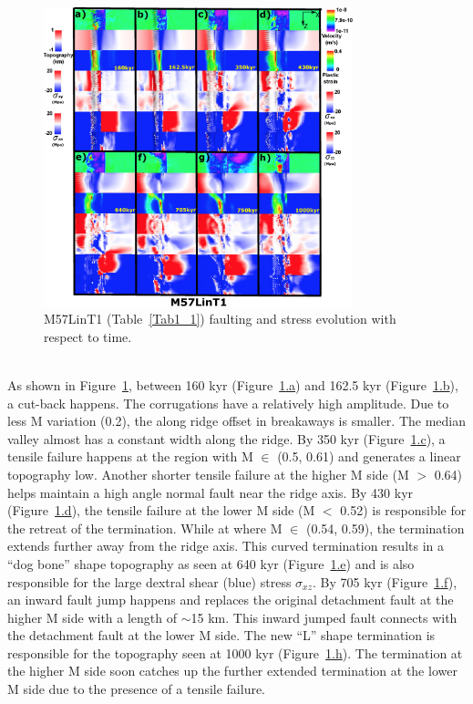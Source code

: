 \begin{figure}[h]
 \centering
  \includegraphics[width=0.8\textwidth]{./Figures/fig_Results_MRange_2_M57LinT1_time_evolution.eps}
 \caption{M57LinT1 (Table~\hyperref[Tab1_1]{\ref{Tab1_1}}) faulting and stress evolution with respect to time.}
\label{fig_Results_MRange_2}
\end{figure}
~\\
As shown in Figure~\hyperref[fig_Results_MRange_2]{\ref{fig_Results_MRange_2}}, between 160 kyr (Figure~\hyperref[fig_Results_MRange_2]{\ref{fig_Results_MRange_2}.a}) and 162.5 kyr (Figure~\hyperref[fig_Results_MRange_2]{\ref{fig_Results_MRange_2}.b}), a cut-back happens. The corrugations have a relatively high amplitude. Due to less M variation (0.2), the along ridge offset in breakaways is smaller. The median valley almost has a constant width along the ridge. By 350 kyr (Figure~\hyperref[fig_Results_MRange_2]{\ref{fig_Results_MRange_2}.c}), a tensile failure happens at the region with M $\in$ (0.5, 0.61) and generates a linear topography low. Another shorter tensile failure at the higher M side (M $>$ 0.64) helps maintain a high angle normal fault near the ridge axis. By 430 kyr (Figure~\hyperref[fig_Results_MRange_2]{\ref{fig_Results_MRange_2}.d}), the tensile failure at the lower M side (M $<$ 0.52) is responsible for the retreat of the termination. While at where M $\in$ (0.54, 0.59), the termination extends further away from the ridge axis. This curved termination results in a ``dog bone'' shape topography as seen at 640 kyr (Figure~\hyperref[fig_Results_MRange_2]{\ref{fig_Results_MRange_2}.e}) and is also responsible for the large dextral shear (blue) stress $\sigma_{xz}$. By 705 kyr (Figure~\hyperref[fig_Results_MRange_2]{\ref{fig_Results_MRange_2}.f}), an inward fault jump happens and replaces the original detachment fault at the higher M side with a length of $\sim$15 km. This inward jumped fault connects with the detachment fault at the lower M side. The new ``L'' shape termination is responsible for the topography seen at 1000 kyr (Figure~\hyperref[fig_Results_MRange_2]{\ref{fig_Results_MRange_2}.h}). The termination at the higher M side soon catches up the further extended termination at the lower M side due to the presence of a tensile failure.
       
